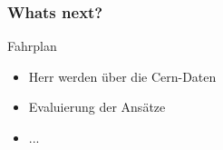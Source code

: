 \documentclass[18pt]{beamer}
\begin{document}
	\begin{frame}[c]\frametitle{Whats next?}
		\begin{block}{Fahrplan}
		    \begin{itemize}
		    	\item Herr werden über die Cern-Daten
		    	\item Evaluierung der Ansätze
		    	\item ...
		    \end{itemize}
		\end{block}
	\end{frame}
\end{document}
